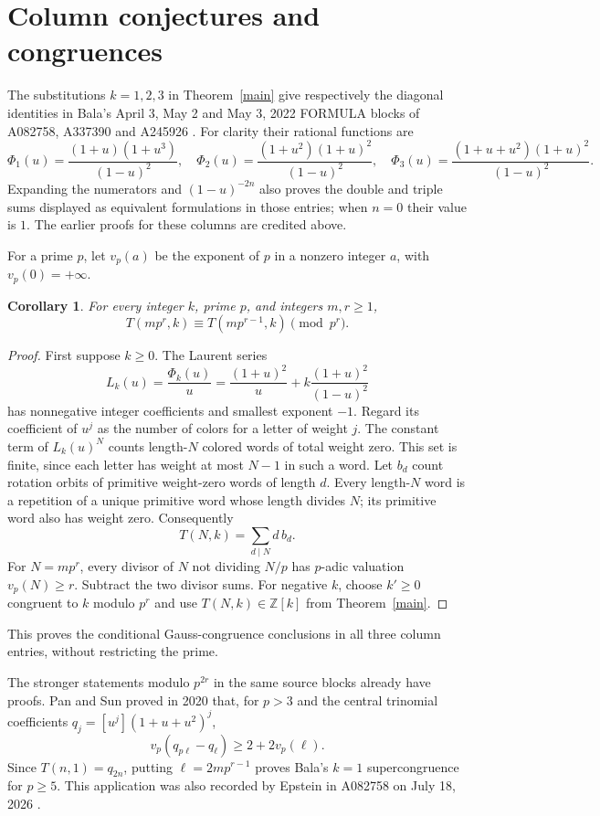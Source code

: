 \documentclass[11pt]{article}
\newtheorem{corollary}[theorem]{Corollary}
\begin{document}
\section{Column conjectures and congruences}
The substitutions $k=1,2,3$ in Theorem~\ref{main} give respectively
the diagonal identities in Bala's April 3, May 2 and May 3, 2022
FORMULA blocks of A082758, A337390 and A245926
\cite{columnone,columntwo,columnthree}.
For clarity their rational functions are
\[
 \Phi_1(u)=\frac{(1+u)(1+u^3)}{(1-u)^2},\quad
 \Phi_2(u)=\frac{(1+u^2)(1+u)^2}{(1-u)^2},\quad
 \Phi_3(u)=\frac{(1+u+u^2)(1+u)^2}{(1-u)^2}.
\]
Expanding the numerators and $(1-u)^{-2n}$ also proves the double
and triple sums displayed as equivalent formulations in those entries;
when $n=0$ their value is $1$. The earlier proofs for these columns
are credited above.

For a prime $p$, let $v_p(a)$ be the exponent of $p$ in a nonzero
integer $a$, with $v_p(0)=+\infty$.
\begin{corollary}\label{gauss}
For every integer $k$, prime $p$, and integers $m,r\geq1$,
\[
 T(mp^r,k)\equiv T(mp^{r-1},k)\pmod {p^r}.
\]
\end{corollary}
\begin{proof}
First suppose $k\geq0$. The Laurent series
\[
 L_k(u)=\frac{\Phi_k(u)}u
 =\frac{(1+u)^2}u+k\frac{(1+u)^2}{(1-u)^2}
\]
has nonnegative integer coefficients and smallest exponent $-1$.
Regard its coefficient of $u^j$ as the number of colors for a letter
of weight $j$. The constant term of $L_k(u)^N$ counts length-$N$
colored words of total weight zero. This set is finite, since each
letter has weight at most $N-1$ in such a word.
Let $b_d$ count rotation orbits of primitive weight-zero words of
length $d$. Every length-$N$ word is a repetition of a unique primitive
word whose length divides $N$; its primitive word also has weight zero.
Consequently
\[
 T(N,k)=\sum_{d\mid N}d\,b_d.
\]
For $N=mp^r$, every divisor of $N$ not dividing $N/p$ has
$p$-adic valuation $v_p(N)\geq r$. Subtract the two divisor sums.
For negative $k$, choose $k'\geq0$ congruent to $k$ modulo $p^r$
and use $T(N,k)\in\mathbb Z[k]$ from Theorem~\ref{main}.
\end{proof}
This proves the conditional Gauss-congruence conclusions in all three
column entries, without restricting the prime.

The stronger statements modulo $p^{2r}$ in the same source blocks
already have proofs. Pan and Sun \cite[Theorem 1.1]{pansun} proved
in 2020 that, for $p>3$ and the central trinomial coefficients
$q_j=[u^j](1+u+u^2)^j$,
\[
 v_p(q_{p\ell}-q_\ell)\geq 2+2v_p(\ell).
\]
Since $T(n,1)=q_{2n}$, putting
$\ell=2mp^{r-1}$ proves Bala's $k=1$ supercongruence for $p\geq5$.
This application was also recorded by Epstein in A082758 on
July 18, 2026 \cite{columnone}.
\end{document}
